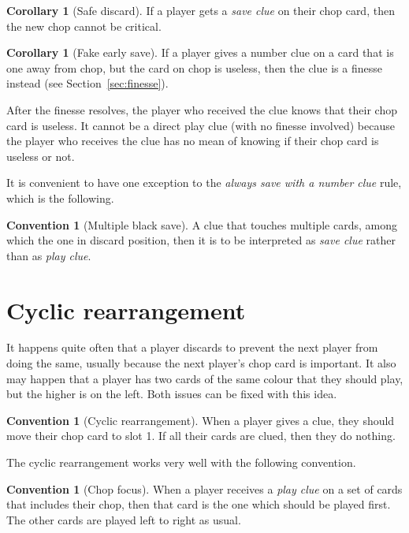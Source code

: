 \documentclass[a4paper]{article}
\theoremstyle{plain}
\theoremstyle{definition}
\newtheorem{corollary}[theorem]{Corollary}
\newtheorem{convention}[theorem]{Convention}
\begin{document}
\begin{corollary}[Safe discard]
	If a player gets a \emph{save clue} on their chop card, then the new chop cannot be critical.
\end{corollary}

\begin{corollary}[Fake early save]
	\label{fake-early-save}
	If a player gives a number clue on a card that is one away from chop, but the card on chop is useless, then the clue is a finesse instead (see Section~\ref{sec:finesse}).
\end{corollary}

After the finesse resolves, the player who received the clue knows that their chop card is useless. It cannot be a direct play clue (with no finesse involved) because the player who receives the clue has no mean of knowing if their chop card is useless or not.

It is convenient to have one exception to the \emph{always save with a number clue} rule, which is the following.

\begin{convention}[Multiple black save]
	A  clue that touches multiple cards, among which the one in discard position, then it is to be interpreted as \emph{save clue} rather than as \emph{play clue}.
\end{convention}

\section{Cyclic rearrangement}

It happens quite often that a player discards to prevent the next player from doing the same, usually because the next player's chop card is important. It also may happen that a player has two cards of the same colour that they should play, but the higher is on the left. Both issues can be fixed with this idea.

\begin{convention}[Cyclic rearrangement]
	\label{cyclic-rearrangement}
	When a player gives a clue, they should move their chop card to slot 1. If all their cards are clued, then they do nothing.
\end{convention}

The cyclic rearrangement works very well with the following convention.

\begin{convention}[Chop focus]
	\label{chop-focus}
	When a player receives a \emph{play clue} on a set of cards that includes their chop, then that card is the one which should be played first. The other cards are played left to right as usual.
\end{convention}
\end{document}
